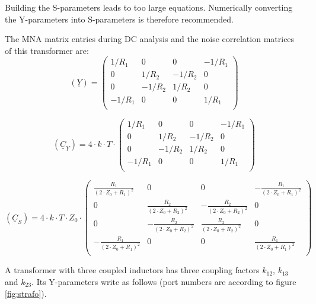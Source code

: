 Building the S-parameters leads to too large equations. Numerically
converting the Y-parameters into S-parameters is therefore recommended.

\addvspace{12pt}

The MNA matrix entries during DC analysis and the noise correlation
matrices of this transformer are:
\begin{equation}
(\underline{Y}) =
\begin{pmatrix}
 1/R_1 & 0 & 0 & -1/R_1 \\
 0 &  1/R_2 & -1/R_2 & 0 \\
 0 & -1/R_2 &  1/R_2 & 0 \\
-1/R_1 & 0 & 0 &  1/R_1 \\
\end{pmatrix}
\end{equation}

\begin{equation}
(\underline{C}_Y) = 4\cdot k\cdot T\cdot
\begin{pmatrix}
 1/R_1 & 0 & 0 & -1/R_1 \\
 0 &  1/R_2 & -1/R_2 & 0 \\
 0 & -1/R_2 &  1/R_2 & 0 \\
-1/R_1 & 0 & 0 &  1/R_1 \\
\end{pmatrix}
\end{equation}

\begin{equation}
(\underline{C}_S) = 4\cdot k\cdot T\cdot Z_0\cdot
\begin{pmatrix}
 \tfrac{R_1}{(2\cdot Z_0 + R_1)^2} & 0 & 0 & -\tfrac{R_1}{(2\cdot Z_0 + R_1)^2} \\
 0 &  \tfrac{R_2}{(2\cdot Z_0 + R_2)^2} & -\tfrac{R_2}{(2\cdot Z_0 + R_2)^2} & 0 \\
 0 & -\tfrac{R_2}{(2\cdot Z_0 + R_2)^2} &  \tfrac{R_2}{(2\cdot Z_0 + R_2)^2} & 0 \\
-\tfrac{R_1}{(2\cdot Z_0 + R_1)^2} & 0 & 0 &  \tfrac{R_1}{(2\cdot Z_0 + R_1)^2} \\
\end{pmatrix}
\end{equation}

\addvspace{12pt}

A transformer with three coupled inductors has three coupling factors
$k_{12}$, $k_{13}$ and $k_{23}$.  Its Y-parameters write as follows
(port numbers are according to figure \ref{fig:strafo}).

